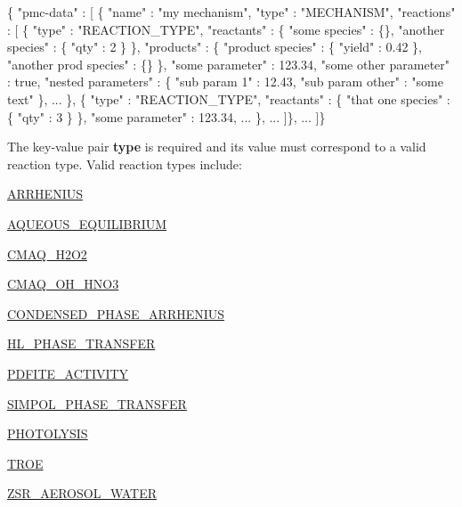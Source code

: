 \begin{DoxyCode}
\{ "pmc-data" : [
  \{
    "name" : "my mechanism",
    "type" : "MECHANISM",
    "reactions" : [
    \{
      "type" : "REACTION\_TYPE",
      "reactants" : \{
        "some species" : \{\},
        "another species" : \{ "qty" : 2 \}
      \},
      "products" : \{
        "product species" : \{ "yield" : 0.42 \},
        "another prod species" : \{\}
      \},
      "some parameter" : 123.34,
      "some other parameter" : true,
      "nested parameters" : \{
         "sub param 1" : 12.43,
         "sub param other" : "some text"
      \},
      ...
    \},
    \{
      "type" : "REACTION\_TYPE",
      "reactants" : \{
        "that one species" : \{ "qty" : 3 \}
      \},
      "some parameter" : 123.34,
      ...
    \},
    ...
  ]\},
  ...
]\}
\end{DoxyCode}
 The key-\/value pair {\bfseries type} is required and its value must correspond to a valid reaction type. Valid reaction types include\+:


\begin{DoxyItemize}
\item \mbox{\hyperlink{phlex_rxn_arrhenius}{A\+R\+R\+H\+E\+N\+I\+US}}
\item \mbox{\hyperlink{phlex_rxn_aqueous_equilibrium}{A\+Q\+U\+E\+O\+U\+S\+\_\+\+E\+Q\+U\+I\+L\+I\+B\+R\+I\+UM}}
\item \mbox{\hyperlink{phlex_rxn_CMAQ_H2O2}{C\+M\+A\+Q\+\_\+\+H2\+O2}}
\item \mbox{\hyperlink{phlex_rxn_CMAQ_OH_HNO3}{C\+M\+A\+Q\+\_\+\+O\+H\+\_\+\+H\+N\+O3}}
\item \mbox{\hyperlink{phlex_rxn_condensed_phase_arrhenius}{C\+O\+N\+D\+E\+N\+S\+E\+D\+\_\+\+P\+H\+A\+S\+E\+\_\+\+A\+R\+R\+H\+E\+N\+I\+US}}
\item \mbox{\hyperlink{phlex_rxn_HL_phase_transfer}{H\+L\+\_\+\+P\+H\+A\+S\+E\+\_\+\+T\+R\+A\+N\+S\+F\+ER}}
\item \mbox{\hyperlink{phlex_rxn_PDFiTE_activity}{P\+D\+F\+I\+T\+E\+\_\+\+A\+C\+T\+I\+V\+I\+TY}}
\item \mbox{\hyperlink{phlex_rxn_SIMPOL_phase_transfer}{S\+I\+M\+P\+O\+L\+\_\+\+P\+H\+A\+S\+E\+\_\+\+T\+R\+A\+N\+S\+F\+ER}}
\item \mbox{\hyperlink{phlex_rxn_photolysis}{P\+H\+O\+T\+O\+L\+Y\+S\+IS}}
\item \mbox{\hyperlink{phlex_rxn_troe}{T\+R\+OE}}
\item \mbox{\hyperlink{phlex_rxn_ZSR_aerosol_water}{Z\+S\+R\+\_\+\+A\+E\+R\+O\+S\+O\+L\+\_\+\+W\+A\+T\+ER}}
\end{DoxyItemize}

